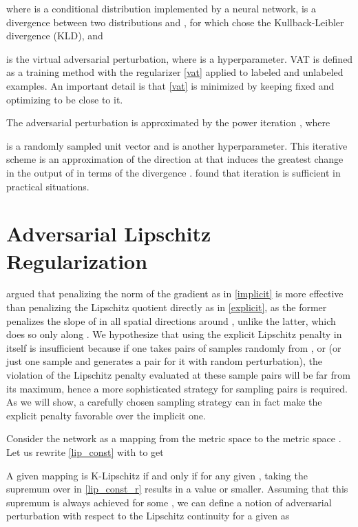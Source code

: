 \documentclass{article}
\begin{document}
where  is a conditional distribution implemented by a neural network,  is a divergence between two distributions  and , for which \citet{Miyatoetal2017} chose the Kullback-Leibler divergence (KLD), and

is the virtual adversarial perturbation, where  is a hyperparameter. VAT is defined as a training method with the regularizer \eqref{vat} applied to labeled and unlabeled examples. An important detail is that \eqref{vat} is minimized by keeping  fixed and optimizing  to be close to it.

The adversarial perturbation is approximated by the power iteration , where

 is a randomly sampled unit vector and  is another hyperparameter. This iterative scheme is an approximation of the direction at  that induces the greatest change in the output of  in terms of the divergence . \cite{Miyatoetal2017} found that  iteration is sufficient in practical situations.

\section{Adversarial Lipschitz Regularization}
\label{alr}
\citet{Adleretal2018} argued that penalizing the norm of the gradient as in \eqref{implicit} is more effective than penalizing the Lipschitz quotient directly as in \eqref{explicit}, as the former penalizes the slope of  in all spatial directions around , unlike the latter, which does so only along .  We hypothesize that using the explicit Lipschitz penalty in itself is insufficient because if one takes pairs of samples  randomly from ,  or  (or just one sample and generates a pair for it with random perturbation), the violation of the Lipschitz penalty evaluated at these sample pairs will be far from its maximum, hence a more sophisticated strategy for sampling pairs is required. As we will show, a carefully chosen sampling strategy can in fact make the explicit penalty favorable over the implicit one.

Consider the network  as a mapping from the metric space  to the metric space . Let us rewrite \eqref{lip_const} with  to get

A given mapping  is K-Lipschitz if and only if for any given , taking the supremum over  in \eqref{lip_const_r} results in a value  or smaller. Assuming that this supremum is always achieved for some , we can define a notion of adversarial perturbation with respect to the Lipschitz continuity for a given  as
\end{document}
